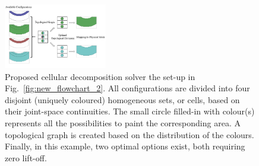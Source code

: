 \documentclass[journal]{IEEEtran}
\begin{document}

\begin{figure}[t]
\centering
\includegraphics[width = 0.4\textwidth]{figures/other_figures/flowchart}
\caption{Proposed cellular decomposition solver the set-up in Fig.~\ref{fig:new_flowchart_2}. All configurations are divided into four disjoint (uniquely coloured) homogeneous sets, or cells, based on their joint-space continuities. The small circle filled-in with colour(s) represents all the possibilities to paint the corresponding area. A topological graph is created based on the distribution of the colours. Finally, in this example, two optimal options exist, both requiring zero lift-off.}
\label{fig:solver}
\end{figure}
\end{document}
